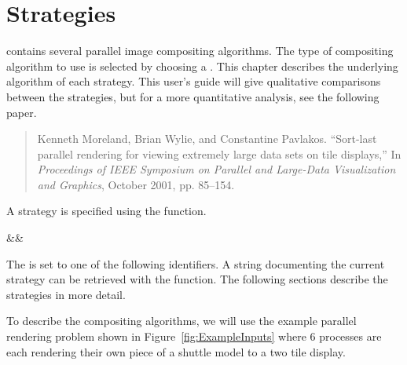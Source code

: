 

\chapter{Strategies}
\label{chap:Strategies}


\IceT contains several parallel image compositing algorithms.  The type of
compositing algorithm to use is selected by choosing a
.  This chapter describes the underlying
algorithm of each strategy.  This user's guide will give qualitative
comparisons between the strategies, but for a more quantitative analysis,
see the following paper.

\begin{quote}
  Kenneth Moreland, Brian Wylie, and Constantine Pavlakos.  ``Sort-last
  parallel rendering for viewing extremely large data sets on tile
  displays,'' In \emph{Proceedings of IEEE Symposium on Parallel and
    Large-Data Visualization and Graphics}, October 2001, pp. 85--154.
\end{quote}

A strategy is specified using the  function.

\begin{Table}{3}
  \textC{(}&&\quad\textC{);}
\end{Table}

The  is set to one of the following identifiers.  A string
documenting the current strategy can be retrieved with the
 function.  The following sections describe the
strategies in more detail.



To describe the \IceT compositing algorithms, we will use the example
parallel rendering problem shown in Figure~\ref{fig:ExampleInputs} where 6
processes are each rendering their own piece of a shuttle model to a two
tile display.

